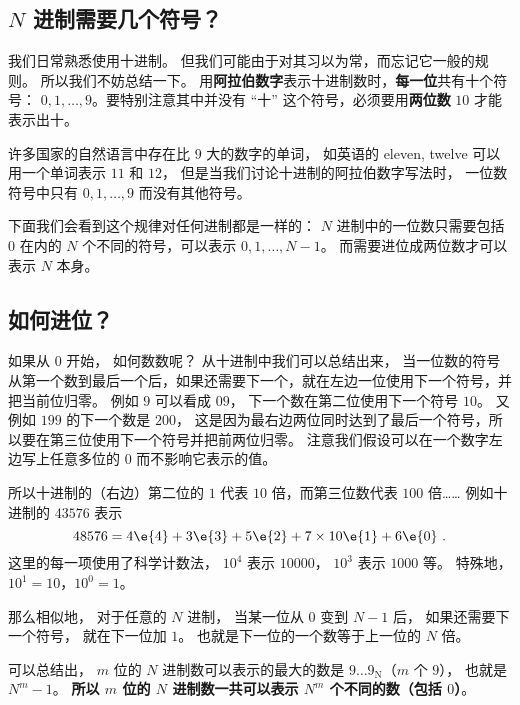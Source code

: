 
\begin{issues}
\issueDraft
\end{issues}

\subsection{$N$ 进制需要几个符号？}
我们日常熟悉使用十进制。 但我们可能由于对其习以为常，而忘记它一般的规则。 所以我们不妨总结一下。 用\textbf{阿拉伯数字}表示十进制数时，\textbf{每一位}共有十个符号： $0,1,\dots, 9$。要特别注意其中并没有 “十” 这个符号，必须要用\textbf{两位数} $10$ 才能表示出十。

许多国家的自然语言中存在比 $9$ 大的数字的单词， 如英语的 eleven, twelve 可以用一个单词表示 $11$ 和 $12$， 但是当我们讨论十进制的阿拉伯数字写法时， 一位数符号中只有 $0,1,\dots, 9$ 而没有其他符号。 

下面我们会看到这个规律对任何进制都是一样的： $N$ 进制中的一位数只需要包括 $0$ 在内的 $N$ 个不同的符号，可以表示 $0,1,\dots,N-1$。 而需要进位成两位数才可以表示 $N$ 本身。

\subsection{如何进位？}
如果从 $0$ 开始， 如何数数呢？ 从十进制中我们可以总结出来， 当一位数的符号从第一个数到最后一个后，如果还需要下一个，就在左边一位使用下一个符号，并把当前位归零。 例如 $9$ 可以看成 $09$， 下一个数在第二位使用下一个符号 $10$。 又例如 $199$ 的下一个数是 $200$， 这是因为最右边两位同时达到了最后一个符号，所以要在第三位使用下一个符号并把前两位归零。 注意我们假设可以在一个数字左边写上任意多位的 $0$ 而不影响它表示的值。

所以十进制的（右边）第二位的 $1$ 代表 $10$ 倍，而第三位数代表 $100$ 倍…… 例如十进制的 $43576$ 表示
\begin{equation}\label{eq_Binary_1}
48576 = 4\e{4} + 3\e{3} + 5\e{2} + 7\times 10\e{1} + 6\e{0}~.
\end{equation}
这里的每一项使用了科学计数法，%
$10^4$ 表示 $10000$， $10^3$ 表示 $1000$ 等。 特殊地， $10^1=10$，$10^0=1$。

那么相似地， 对于任意的 $N$ 进制， 当某一位从 $0$ 变到 $N-1$ 后， 如果还需要下一个符号， 就在下一位加 $1$。 也就是下一位的一个数等于上一位的 $N$ 倍。

可以总结出， $m$ 位的 $N$ 进制数可以表示的最大的数是 $9\dots9_\text{N}$（$m$ 个 $9$）， 也就是 $N^m-1$。 \textbf{所以 $m$ 位的 $N$ 进制数一共可以表示 $N^m$ 个不同的数（包括 $0$）}。

